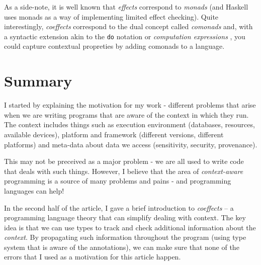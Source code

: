 As a side-note, it is well known that \emph{effects} correspond to \emph{monads} (and Haskell uses
monads as a way of implementing limited effect checking). Quite interestingly, \emph{coeffects}
correspond to the dual concept called \emph{comonads} and, with a syntactic extension akin to 
the \texttt{do} notation or \emph{computation expressions} \cite{xx}, you could capture contextual 
propreties by adding comonads to a language.


\section{Summary}

I started by explaining the
motivation for my work - different problems that arise when we are writing programs that are
aware of the context in which they run. The context includes things such as execution environment
(databases, resources, available devices), platform and framework (different versions, different
platforms) and meta-data about data we access (sensitivity, security, provenance). 

This may not be preceived as a major problem - we are all used to write code that deals with
such things. However, I believe that the area of \emph{context-aware} programming is a source of
many problems and pains - and programming languages can help!

In the second half of the article, I gave a brief introduction to \emph{coeffects} -- a programming
language theory that can simplify dealing with context.
The key idea is that we can use types to track and check additional information about
the \emph{context}. By propagating such information throughout the program (using type system
that is aware of the annotations), we can make sure that none of the errors that I used
as a motivation for this article happen. 
